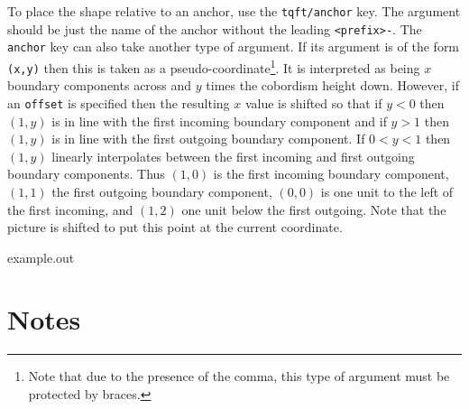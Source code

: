 \documentclass{ltxdoc}
\newenvironment{example}
  {\VerbatimEnvironment
   \begin{VerbatimOut}{example.out}}
  {\end{VerbatimOut}
   \begin{center}
   \setlength{\parindent}{0pt}
   \fbox{\begin{minipage}{.9\linewidth}
     \lstset{breakatwhitespace=true,breaklines=true,language=TeX,basicstyle=\small}
     
   \end{minipage}}

   \fbox{\begin{minipage}{.9\linewidth}
     \centering
     
   \end{minipage}}
\end{center}
}
\begin{document}
To place the shape relative to an anchor, use the \Verb+tqft/anchor+ key.
The argument should be just the name of the anchor without the leading \Verb+<prefix>-+.
The \Verb+anchor+ key can also take another type of argument.
If its argument is of the form \Verb+(x,y)+ then this is taken as a pseudo-coordinate\footnote{Note that due to the presence of the comma, this type of argument must be protected by braces.}.
It is interpreted as being \(x\) boundary components across and \(y\) times the cobordism height down.
However, if an \Verb+offset+ is specified then the resulting \(x\) value is shifted so that if \(y < 0\) then \((1,y)\) is in line with the first incoming boundary component and if \(y > 1\) then \((1,y)\) is in line with the first outgoing boundary component.
If \(0 < y < 1\) then \((1,y)\) linearly interpolates between the first incoming and first outgoing boundary components.
Thus \((1,0)\) is the first incoming boundary component, \((1,1)\) the first outgoing boundary component, \((0,0)\) is one unit to the left of the first incoming, and \((1,2)\) one unit below the first outgoing.
Note that the picture is shifted to put this point at the current coordinate.

\begin{example}
\end{example}

\section{Notes}
\end{document}
